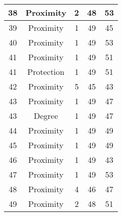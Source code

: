 \documentclass[results.tex]{subfiles}
\begin{document}
\begin{center}
\begin{tabular}{| c || c | c | c | c |}
            \hline
            38                      & Proximity                    & 2                      & 48                      & 53                   \\
            \hline
            39                      & Proximity                    & 1                      & 49                      & 45                   \\
            \hline
            40                      & Proximity                    & 1                      & 49                      & 53                   \\
            \hline
            41                      & Proximity                    & 1                      & 49                      & 51                   \\
            \hline
            41                      & Protection                   & 1                      & 49                      & 51                   \\
            \hline
            42                      & Proximity                    & 5                      & 45                      & 43                   \\
            \hline
            43                      & Proximity                    & 1                      & 49                      & 47                   \\
            \hline
            43                      & Degree                       & 1                      & 49                      & 47                   \\
            \hline
            44                      & Proximity                    & 1                      & 49                      & 49                   \\
            \hline
            45                      & Proximity                    & 1                      & 49                      & 49                   \\
            \hline
            46                      & Proximity                    & 1                      & 49                      & 43                   \\
            \hline
            47                      & Proximity                    & 1                      & 49                      & 53                   \\
            \hline
            48                      & Proximity                    & 4                      & 46                      & 47                   \\
            \hline
            49                      & Proximity                    & 2                      & 48                      & 51                   \\
            \hline
        \end{tabular}
    \end{center}
\end{document}
